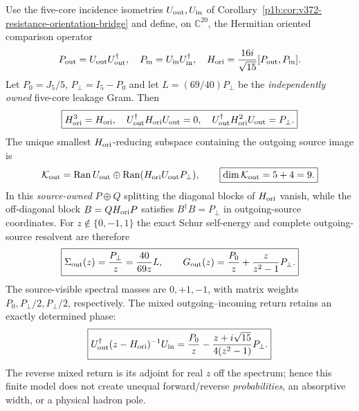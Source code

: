 \documentclass[11pt]{article}
\begin{document}
\begin{theorem}
\label{p1b:thm:v374-outgoing-source-cyclic-schur}
Use the five-core incidence isometries $U_{\rm out},U_{\rm in}$ of
Corollary~\ref{p1b:cor:v372-resistance-orientation-bridge} and define, on
$\mathbb C^{20}$, the Hermitian oriented comparison operator
\[
 P_{\rm out}=U_{\rm out}U_{\rm out}^{\dagger},\quad
 P_{\rm in}=U_{\rm in}U_{\rm in}^{\dagger},\quad
 H_{\rm ori}=\frac{16i}{\sqrt{15}}[P_{\rm out},P_{\rm in}].
\]
Let $P_0=J_5/5$, $P_\perp=I_5-P_0$ and let $L=(69/40)P_\perp$
be the \emph{independently owned} five-core leakage Gram. Then
\[
 \boxed{H_{\rm ori}^3=H_{\rm ori},\quad
 U_{\rm out}^{\dagger}H_{\rm ori}U_{\rm out}=0,\quad
 U_{\rm out}^{\dagger}H_{\rm ori}^2U_{\rm out}=P_\perp.}
\]
The unique smallest $H_{\rm ori}$-reducing subspace containing the
outgoing source image is
\[
 \mathcal K_{\rm out}=\operatorname{Ran}U_{\rm out}
 \oplus\operatorname{Ran}(H_{\rm ori}U_{\rm out}P_\perp),
 \qquad\boxed{\dim\mathcal K_{\rm out}=5+4=9.}
\]
In this \emph{source-owned} $P\oplus Q$ splitting the diagonal blocks
of $H_{\rm ori}$ vanish, while the off-diagonal block $B=QH_{\rm ori}P$
satisfies $B^{\dagger}B=P_\perp$ in outgoing-source coordinates.
For $z\notin\{0,-1,1\}$ the exact Schur self-energy and complete
outgoing-source resolvent are therefore
\[
 \boxed{\Sigma_{\rm out}(z)=\frac{P_\perp}{z}
       =\frac{40}{69z}L,\qquad
 G_{\rm out}(z)=\frac{P_0}{z}+\frac{z}{z^2-1}P_\perp.}
\]
The source-visible spectral masses are $0,+1,-1$, with matrix
weights $P_0,P_\perp/2,P_\perp/2$, respectively.  The mixed
outgoing--incoming return retains an exactly determined phase:
\[
 \boxed{U_{\rm out}^{\dagger}(z-H_{\rm ori})^{-1}U_{\rm in}
 =\frac{P_0}{z}-\frac{z+i\sqrt{15}}{4(z^2-1)}P_\perp.}
\]
The reverse mixed return is its adjoint for real $z$ off the spectrum;
hence this finite model does not create unequal forward/reverse
\emph{probabilities}, an absorptive width, or a physical hadron pole.
\end{theorem}
\end{document}
